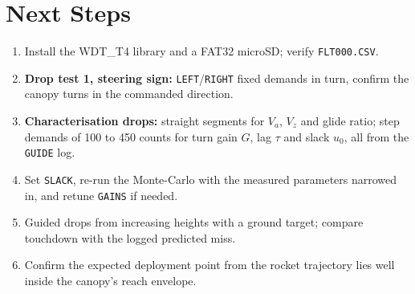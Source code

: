 \documentclass[11pt,a4paper]{article}
\newcommand{\code}[1]{\texttt{#1}}
\begin{document}
\section{Next Steps}
\begin{enumerate}
  \item Install the WDT\_T4 library and a FAT32 microSD; verify \code{FLT000.CSV}.
  \item \textbf{Drop test 1, steering sign:} \code{LEFT}/\code{RIGHT} fixed
        demands in turn, confirm the canopy turns in the commanded direction.
  \item \textbf{Characterisation drops:} straight segments for $V_a$, $V_z$
        and glide ratio; step demands of 100 to 450 counts for turn gain $G$,
        lag $\tau$ and slack $u_0$, all from the \code{GUIDE} log.
  \item Set \code{SLACK}, re-run the Monte-Carlo with the measured
        parameters narrowed in, and retune \code{GAINS} if needed.
  \item Guided drops from increasing heights with a ground target; compare
        touchdown with the logged predicted miss.
  \item Confirm the expected deployment point from the rocket trajectory lies
        well inside the canopy's reach envelope.
\end{enumerate}

\appendix
\end{document}
